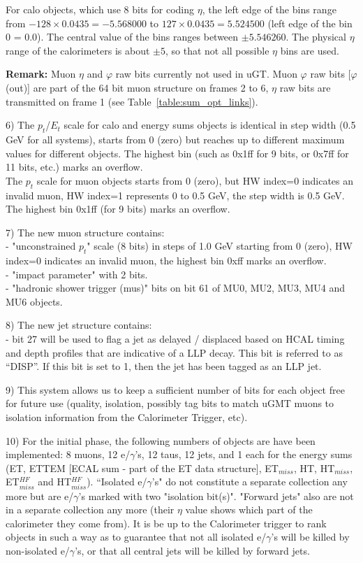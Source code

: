 \documentclass{cmspaper}
\begin{document}
For calo objects, which use 8 bits for coding $\eta$, the left edge of the bins range from $-128 \times 0.0435 = -5.568000$ to $127 \times 0.0435 = 5.524500$ (left edge of the bin 0 = 0.0). The central value of the bins ranges between $\pm 5.546260$. The physical $\eta$ range of the calorimeters is about $\pm5$, so that not all possible $\eta$ bins are used.

\textbf{Remark:} Muon $\eta$ and $\varphi$ raw bits currently not used in uGT. Muon $\varphi$ raw bits [$\varphi$ (out)] are part of the 64 bit muon structure on frames 2 to 6, $\eta$ raw bits are transmitted on frame 1 (see Table~\ref{table:sum_opt_links}).

6) The $p_t$/$E_t$ scale for calo and energy sums objects is identical in step width (0.5 GeV for all systems), starts from 0 (zero) but reaches up to different maximum values for different objects. The highest bin (such as 0x1ff for 9 bits, or 0x7ff for 11 bits, etc.) marks an overflow.\\
The $p_t$ scale for muon objects starts from 0 (zero), but HW index=0 indicates an invalid muon, HW index=1 represents 0 to 0.5 GeV, the step width is 0.5 GeV. The highest bin 0x1ff (for 9 bits) marks an overflow.

7) The new muon structure contains:\\
- "unconstrained $p_t$" scale (8 bits) in steps of 1.0 GeV starting from 0 (zero), HW index=0 indicates an invalid muon, the highest bin 0xff marks an overflow.\\
- "impact parameter" with 2 bits.\\
- "hadronic shower trigger (mus)" bits on bit 61 of MU0, MU2, MU3, MU4 and MU6 objects.

8) The new jet structure contains:\\
- bit 27 will be used to flag a jet as delayed / displaced based on HCAL timing and depth profiles that are indicative of a LLP decay. This bit is referred to as “DISP”. If this bit is set to 1, then the jet has been tagged as an LLP jet.

9) This system allows us to keep a sufficient number of bits for each object free for future use (quality, isolation, possibly tag bits to match uGMT muons to isolation information from the Calorimeter Trigger, etc).

10) For the initial phase, the following numbers of objects are have been implemented: 8 muons, 12 e/$\gamma$'s, 12 taus, 12 jets, and 1 each for the energy sums (ET, ETTEM [ECAL sum - part of the ET data structure], ET$_{miss}$, HT, HT$_{miss}$, ET$_{miss}^{HF}$ and HT$_{miss}^{HF}$).
``Isolated e/$\gamma$'s" do not constitute a separate collection any more but are e/$\gamma$'s marked with two "isolation bit(s)". "Forward jets" also are not in a separate collection any more (their $\eta$ value shows which part of the calorimeter they come from). It is be up to the Calorimeter trigger to rank objects in such a way as to guarantee that not all isolated e/$\gamma$'s will be killed by non-isolated e/$\gamma$'s, or that all central jets will be killed by forward jets.
\end{document}

